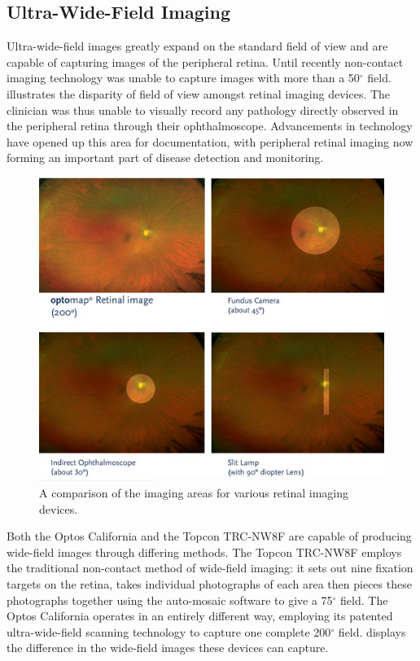 \subsection{Ultra-Wide-Field Imaging}

Ultra-wide-field images greatly expand on the standard field of view and are
capable of capturing images of the peripheral retina. Until recently
non-contact imaging technology was unable to capture images with more
than a 50$^\circ$ field.  illustrates the disparity of
field of view amongst retinal imaging devices. The clinician was thus
unable to visually record any pathology directly observed in the peripheral
retina through their ophthalmoscope. Advancements in technology have
opened up this area for documentation, with peripheral retinal imaging now
forming an important part of disease detection and
monitoring.\cite{8_sides_media_2015}

\begin{figure}[H]
\centering
\includegraphics{figures/uwfcomparison}
\caption{A comparison of the imaging areas for various retinal imaging devices.\cite{1_optos.com_2015}}
\label{fig:uwfc}
   \end{figure}

Both the Optos California and the Topcon TRC-NW8F are capable of
producing wide-field images through differing methods. The Topcon
TRC-NW8F employs the traditional non-contact method of wide-field
imaging: it sets out nine fixation targets on the retina, takes individual
photographs of each area then pieces these photographs together using
the auto-mosaic software to give a 75$^\circ$ field. The Optos California
operates in an entirely different way, employing its patented ultra-wide-field scanning technology to capture one complete 200$^\circ$ field.
 displays the difference in the wide-field images these
devices can capture.

